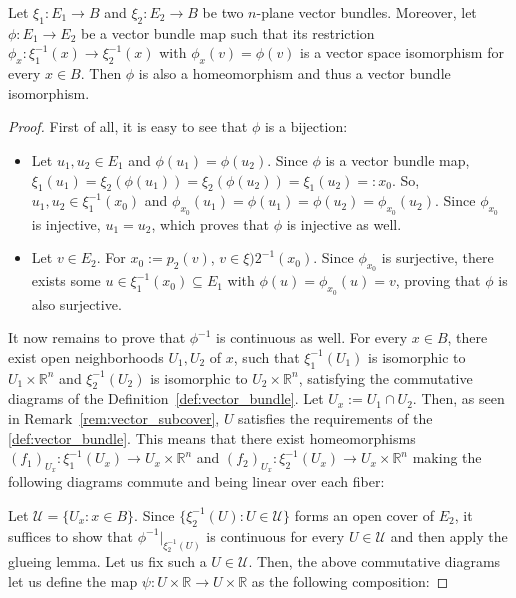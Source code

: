 \begin{proposition}\label{prop:local_to_global_iso_vector} Let $\xi_1:E_1\to B$ and $\xi_2:E_2\to B$ be two $n$-plane vector bundles. Moreover, let $\phi:E_1\to E_2$ be a vector bundle map such that its restriction
$\phi_x:\xi_1^{-1}(x)\to\xi_2^{-1}(x)$
with $\phi_x(v)=\phi(v)$ is a vector space isomorphism for every $x\in B$. Then $\phi$ is also a homeomorphism and thus a vector bundle isomorphism.
\end{proposition}
\begin{proof} First of all, it is easy to see that $\phi$ is a bijection:
\begin{itemize}
\item Let $u_1,u_2\in E_1$ and $\phi(u_1)=\phi(u_2)$. Since $\phi$ is a vector bundle map,
$\xi_1(u_1)=\xi_2(\phi(u_1))=\xi_2(\phi(u_2))=\xi_1(u_2)=:x_0$.
So, $u_1,u_2\in\xi_1^{-1}(x_0)$ and $\phi_{x_0}(u_1)=\phi(u_1)=\phi(u_2)=\phi_{x_0}(u_2)$. Since $\phi_{x_0}$ is injective, $u_1=u_2$, which proves that $\phi$ is injective as well.
\item Let $v\in E_2$. For $x_0:=p_2(v)$, $v\in\xi)2^{-1}(x_0)$. Since $\phi_{x_0}$ is surjective, there exists some $u\in\xi_1^{-1}(x_0)\subseteq E_1$ with $\phi(u)=\phi_{x_0}(u)=v$, proving that $\phi$ is also surjective.
\end{itemize}
It now remains to prove that $\phi^{-1}$ is continuous as well. For every $x\in B$, there exist open neighborhoods $U_1,U_2$ of $x$, such that $\xi_1^{-1}(U_1)$ is isomorphic to $U_1\times\mathbb{R}^n$ and $\xi_2^{-1}(U_2)$ is isomorphic to $U_2\times\mathbb{R}^n$, satisfying the commutative diagrams of the Definition~\ref{def:vector_bundle}. Let $U_x:=U_1\cap U_2$. Then, as seen in Remark~\ref{rem:vector_subcover}, $U$ satisfies the requirements of the \ref{def:vector_bundle}. This means that there exist homeomorphisms $(f_1)_{U_x}:\xi_1^{-1}(U_x)\to U_x\times\mathbb{R}^n$ and $(f_2)_{U_x}:\xi_2^{-1}(U_x)\to U_x\times\mathbb{R}^n$ making the following diagrams commute and being linear over each fiber:
\begin{center}
\end{center}
Let $\mathcal{U}=\{U_x:x\in B\}$. Since $\{\xi_2^{-1}(U):U\in\mathcal{U}\}$ forms an open cover of $E_2$, it suffices to show that $\phi^{-1}|_{\xi_2^{-1}(U)}$ is continuous for every $U\in\mathcal{U}$ and then apply the glueing lemma. Let us fix such a $U\in\mathcal{U}$. Then, the above commutative diagrams let us define the map $\psi:U\times\mathbb{R}\to U\times\mathbb{R}$ as the following composition:

\end{proof}
